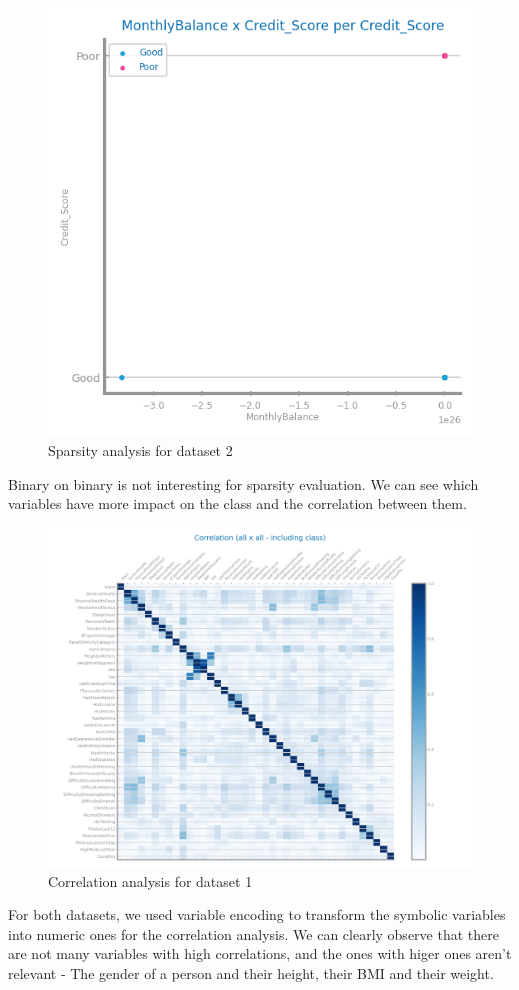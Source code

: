 \documentclass[10pt]{extarticle}
\begin{document}
\begin{figure}[H]
\includegraphics[scale=0.10]{images/dataset2/data_profiling/Credit_Score_sparsity_MonthlyBalance_per_class.png}
\caption{Sparsity analysis for dataset 2}
\end{figure}
Binary on binary is not interesting for sparsity evaluation. We can see which variables have more 
impact on the class and the correlation between them.

\begin{figure}[H]
\centering\includegraphics[scale=0.6]{images/dataset1/data_profiling/CovidPos_correlation_analysis.png}
\caption{Correlation analysis for dataset 1}
\end{figure}
For both datasets, we used variable encoding to transform the symbolic variables into numeric ones for the correlation analysis.
We can clearly observe that there are not many variables with high correlations, and the ones with higer ones aren't relevant -
The gender of a person and their height, their BMI and their weight.
\end{document}
